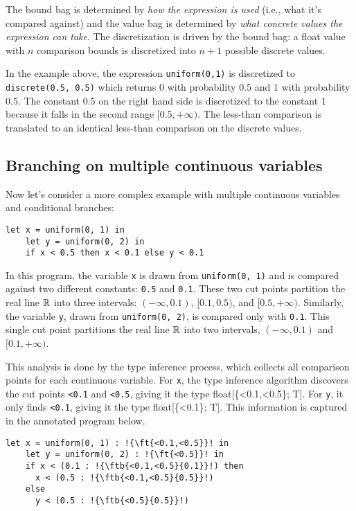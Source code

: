 \documentclass[acmsmall,screen,dvipsnames,x11names,nonacm,anonymous,review]{acmart}
\newcommand{\codetype}[1]{\textcolor{typecolor}{\ttfamily\small#1}}
\newcommand{\ftb}[2]{\codetype{float[\{#1\}; \{#2\}]}}  %
\newcommand{\ft}[1]{\codetype{float[\{#1\}; T]}}        %
\begin{document}
The bound bag is determined by \emph{how the expression is used} (i.e., what it's compared against) and the value bag is determined by \emph{what concrete values the expression can take}.
The discretization is driven by the bound bag: a float value with $n$ comparison bounds is discretized into $n+1$ possible discrete values.

In the example above, the expression \lstinline{uniform(0,1)} is discretized to \lstinline{discrete(0.5, 0.5)} which returns $0$ with probability $0.5$ and $1$ with probability $0.5$.
The constant $0.5$ on the right hand side is discretized to the constant $1$ because it falls in the second range $[0.5, +\infty)$. The less-than comparison is translated to an identical less-than comparison on the discrete values.

\subsection{Branching on multiple continuous variables}

\noindent Now let's consider a more complex example with multiple continuous variables and conditional branches:

\begin{lstlisting}[aboveskip=1em,belowskip=1em]
    let x = uniform(0, 1) in
    let y = uniform(0, 2) in
    if x < 0.5 then x < 0.1 else y < 0.1
\end{lstlisting}

\noindent In this program, the variable \texttt{x} is drawn from \texttt{uniform(0, 1)} and is compared against two different constants: \texttt{0.5} and \texttt{0.1}. These two cut points partition the real line $\mathbb{R}$ into three intervals: $(-\infty, 0.1)$, $[0.1, 0.5)$, and $[0.5, +\infty)$. Similarly, the variable \texttt{y}, drawn from \texttt{uniform(0, 2)}, is compared only with \texttt{0.1}. This single cut point partitions the real line $\mathbb{R}$ into two intervals, $(-\infty, 0.1)$ and $[0.1, +\infty)$.


This analysis is done by the type inference process, which collects all comparison points for each continuous variable. For \texttt{x}, the type inference algorithm discovers the cut points \texttt{<0.1} and \texttt{<0.5}, giving it the type \ft{<0.1,<0.5}. For \texttt{y}, it only finds \texttt{<0.1}, giving it the type \ft{<0.1}. This information is captured in the annotated program below.

\begin{lstlisting}[aboveskip=1em,belowskip=1em,escapechar=!]
    let x = uniform(0, 1) : !{\ft{<0.1,<0.5}}! in
    let y = uniform(0, 2) : !{\ft{<0.5}}! in
    if x < (0.1 : !{\ftb{<0.1,<0.5}{0.1}}!) then
      x < (0.5 : !{\ftb{<0.1,<0.5}{0.5}}!)
    else
      y < (0.5 : !{\ftb{<0.5}{0.5}}!)
\end{lstlisting}
\end{document}
